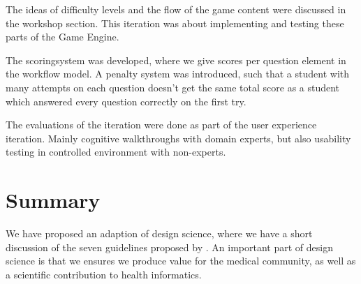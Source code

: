 The ideas of difficulty levels and the flow of the game content were discussed in the workshop section. This iteration was about implementing and testing these parts of the Game Engine.

The scoringsystem was developed, where we give scores per question element in the workflow model.  A penalty system was introduced, such that a student with many attempts on each question doesn't get the same total score as a student which answered every question correctly on the first try.

The evaluations of the iteration were done as part of the user experience iteration. Mainly cognitive walkthroughs with domain experts, but also usability testing in controlled environment with non-experts.

\section{Summary}
We have proposed an adaption of design science, where we have a short discussion of the seven guidelines proposed by \textcite{Hevner2004}. An important part of design science is that we ensures we produce value for the medical community, as well as a scientific contribution to health informatics.

